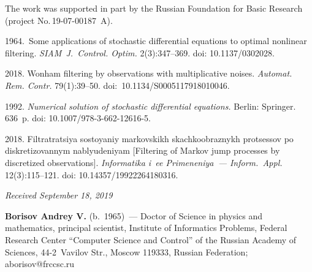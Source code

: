  \Ack
\noindent
The work was supported in part by the Russian Foundation
for Basic Research (project No.\,19-07-00187~A).



  \begin{multicols}{2}

\renewcommand{\bibname}{\protect\rmfamily References}

{\small\frenchspacing
 {%
 \begin{thebibliography}{9}

 1964.~Some applications of stochastic differential equations to optimal
  nonlinear filtering. \textit{SIAM~J.~Control. Optim.} 2(3):347--369. 
  doi: 10.1137/0302028.

2018.
Wonham filtering by observations
with multiplicative noises. \textit{Automat. Rem. Contr.}
79(1):39--50.  
doi:~10.1134/S0005117918010046.

 1992. \textit{Numerical solution of stochastic
differential equations.}  Berlin: Springer. 636~p.
doi: 10.1007/978-3-662-12616-5.

 2018. Filtratratsiya sostoyaniy markovskikh skachkoobraznykh protsessov 
 po diskretizovannym nablyudeniyam [Filtering of Markov jump processes by discretized 
 observations]. \textit{Informatika i~ee Primeneniya~--- Inform.~Appl.} 12(3):115--121.
 doi: 10.14357/19922264180316.
\end{thebibliography}

 }
 }

\end{multicols}


\hfill{\small\textit{Received September 18, 2019}}





\Contrl

\noindent
\textbf{Borisov Andrey V.} (b.\ 1965)~--- 
Doctor of Science in physics and mathematics, principal scientist, 
Institute of Informatics Problems, Federal Research Center 
``Computer Science and Control'' of the Russian Academy of Sciences, 
44-2~Vavilov Str., Moscow 119333, Russian Federation; \mbox{aborisov@frccsc.ru}


\label{end\stat}

\renewcommand{\bibname}{\protect\rm Литература}  